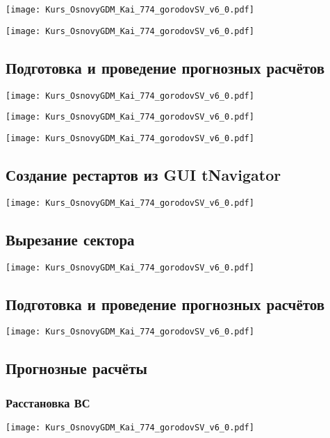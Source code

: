 \documentclass[main.tex]{subfiles}
\begin{document}
\texttt{[image: Kurs\_OsnovyGDM\_Kai\_774\_gorodovSV\_v6\_0.pdf]}

\texttt{[image: Kurs\_OsnovyGDM\_Kai\_774\_gorodovSV\_v6\_0.pdf]}

\subsection{Подготовка и проведение прогнозных расчётов}

\texttt{[image: Kurs\_OsnovyGDM\_Kai\_774\_gorodovSV\_v6\_0.pdf]}

\texttt{[image: Kurs\_OsnovyGDM\_Kai\_774\_gorodovSV\_v6\_0.pdf]}

\texttt{[image: Kurs\_OsnovyGDM\_Kai\_774\_gorodovSV\_v6\_0.pdf]}

\subsection{Создание рестартов из GUI tNavigator}

\texttt{[image: Kurs\_OsnovyGDM\_Kai\_774\_gorodovSV\_v6\_0.pdf]}

\subsection{Вырезание сектора}

\texttt{[image: Kurs\_OsnovyGDM\_Kai\_774\_gorodovSV\_v6\_0.pdf]}

\subsection{Подготовка и проведение прогнозных расчётов}

\texttt{[image: Kurs\_OsnovyGDM\_Kai\_774\_gorodovSV\_v6\_0.pdf]}

\subsection{Прогнозные расчёты}

\subsubsection{Расстановка ВС}

\texttt{[image: Kurs\_OsnovyGDM\_Kai\_774\_gorodovSV\_v6\_0.pdf]}
\end{document}
